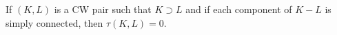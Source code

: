 If $(K, L)$ is a CW pair such that $K \supset L$ and if each component of $K-L$ is simply connected, then $\tau(K, L) = 0$.
